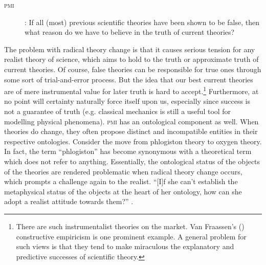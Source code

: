 \documentclass[output=paper]{langscibook}
\begin{document}
\begin{description}
\item[\textsc{pmi}]: If all (most) previous scientific theories have been shown to be false, then what reason do we have to believe in the truth of current theories?
\end{description}

The problem with radical theory change is that it causes serious tension for any realist theory of science, which aims to hold to the truth or approximate truth of current theories. Of course, false theories can be responsible for true ones through some sort of trial-and-error process. But the idea that our best current theories are of mere instrumental value for later truth is hard to accept.\footnote{There are such instrumentalist theories on the market. Van Fraassen's (\citeyear{vanFraasen1980}) constructive empiricism is one prominent example. A general problem for such views is that they tend to make miraculous the explanatory and predictive successes of scientific theory.} Furthermore, at no point will certainty naturally force itself upon us, especially since success is not a guarantee of truth (e.g. classical mechanics is still a useful tool for modelling physical phenomena). \textsc{pmi} has an ontological component as well. When theories do change, they often propose distinct and incompatible entities in their respective ontologies. Consider the move from phlogiston theory to oxygen theory. In fact, the term ``phlogiston'' has become synonymous with a theoretical term which does not refer to anything. Essentially, the ontological status of the objects of the theories are rendered problematic when radical theory change occurs, which prompts a challenge again to the realist. ``[I]f she can't establish the metaphysical status of the objects at the heart of her ontology, how can she adopt a realist attitude towards them?'' \citep[165]{French2011}.
\end{document}
